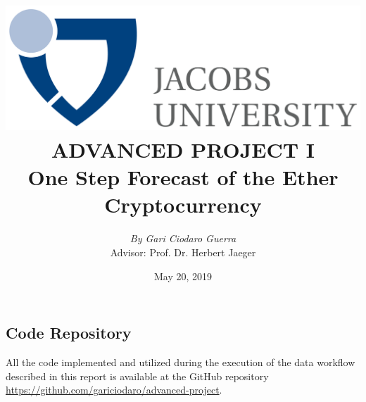 \documentclass{article}
\title{
    {\includegraphics[scale=0.15]{logo-black.png}} \\
    \vspace{1.4cm}
    {\large \textbf{ADVANCED PROJECT I}} \\
    {\large \textbf{One Step Forecast of the Ether Cryptocurrency}} \\
}
\author{\textit{By Gari Ciodaro Guerra}\\[0.2cm]{\small Advisor: Prof. Dr. Herbert Jaeger}}
\date{May 20, 2019}
\begin{document}
\maketitle


\newpage





\clearpage
\appendix
\begin{appendices}
\section{Code Repository}

All the code implemented and utilized during the execution of the data workflow
described in this report is available at the GitHub repository \href{https://github.com/gariciodaro/advanced-project}{https://github.com/gariciodaro/advanced-project}.

\end{appendices}

\clearpage
\newpage
\printbibliography
\end{document}
